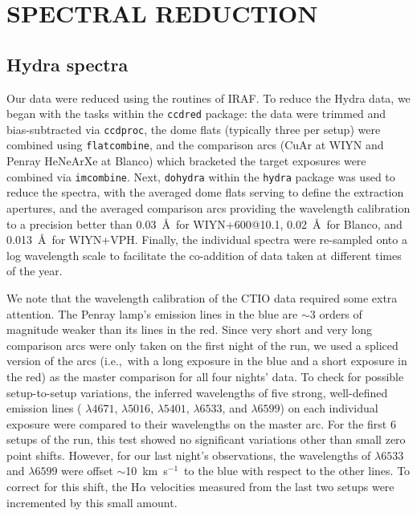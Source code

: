 \documentclass[12pt,preprint]{emulateapj}
\newcommand{\ie}{{i.e.,}}
\newcommand{\kms}{km~s$^{-1}$}
\begin{document}
\section{SPECTRAL REDUCTION}


\subsection{Hydra spectra}
Our data were reduced using the routines of IRAF\footnotemark[5] \citep{v98}.  To reduce the Hydra data, we began with the tasks within the {\tt ccdred} package:  the data were trimmed and bias-subtracted via {\tt ccdproc}, the dome flats (typically three per setup) were combined using {\tt flatcombine}, and the comparison arcs (CuAr at WIYN and Penray HeNeArXe at Blanco) which bracketed the target exposures were combined via {\tt imcombine}.  Next, {\tt dohydra} within the {\tt hydra} package was used to reduce the spectra, with the averaged dome flats serving to define the extraction apertures, and the averaged comparison arcs providing the wavelength calibration to a precision better than 0.03~\AA\ for WIYN+600@10.1, 0.02~\AA\ for Blanco, and 0.013~\AA\ for WIYN+VPH\null.  Finally, the individual spectra were re-sampled onto a log wavelength scale to facilitate the co-addition of data taken at different times of the year.

We note that the wavelength calibration of the CTIO data required some extra attention.  The Penray lamp's emission lines in the blue are $\sim$3 orders of magnitude weaker than its lines in the red.  Since very short and very long comparison arcs were only taken on the first night of the run, we used a spliced version of the arcs (\ie\ with a long exposure in the blue and a short exposure in the red) as the master comparison for all four nights' data.  To check for possible setup-to-setup variations, the inferred wavelengths of five strong, well-defined emission lines ( $\lambda 4671$,  $\lambda 5016$,  $\lambda 5401$,  $\lambda 6533$, and  $\lambda 6599$) on each individual exposure were compared to their wavelengths on the master arc.  For the first 6 setups of the run, this test showed no significant variations other than small zero point shifts.  However, for our last night's observations, the wavelengths of  $\lambda 6533$ and  $\lambda 6599$ were offset $\sim$10~\kms\ to the blue with respect to the other lines.  To correct for this shift, the H$\alpha$ velocities measured from the last two setups were incremented by this small amount.
\end{document}
